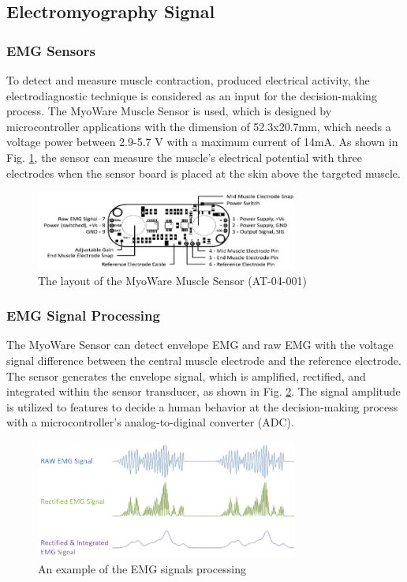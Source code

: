 \documentclass[conference]{IEEEtran}
\begin{document}
\subsection{Electromyography Signal}

\subsubsection{EMG Sensors}

To detect and measure muscle contraction, produced electrical activity, the electrodiagnostic technique is considered as an input for the decision-making process. The MyoWare Muscle Sensor is used, which is designed by microcontroller applications \cite{myo} with the dimension of 52.3x20.7mm, which needs a voltage power between 2.9-5.7 V with a maximum current of 14mA. As shown in Fig. \ref{myo}, the sensor can measure the muscle's electrical potential with three electrodes when the sensor board is placed at the skin above the targeted muscle.

\begin{figure}[h]
  \centering
  \includegraphics[width=3.4in]{myosensor.png}
  \caption{The layout of the MyoWare Muscle Sensor (AT-04-001)}
  \label{myo}
\end{figure}


\subsubsection{EMG Signal Processing}

The MyoWare Sensor can detect envelope EMG and raw EMG with the voltage signal difference between the central muscle electrode and the reference electrode. The sensor generates the envelope signal, which is amplified, rectified, and integrated within the sensor transducer, as shown in Fig. \ref{signal}. The signal amplitude is utilized to features to decide a human behavior at the decision-making process with a microcontroller's analog-to-diginal converter (ADC).

\begin{figure}[h]
  \centering
  \includegraphics[width=3.4in]{signals.png}
  \caption{An example of the EMG signals processing}
  \label{signal}
\end{figure}
\end{document}
